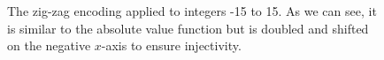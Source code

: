 \begin{figure}
\centering

	\caption[The zig-zag encoding applied to integers -15 to 15.]{\label{fig:zigzag}The zig-zag encoding applied to integers -15 to 15. As we can see, it is similar to the absolute value function but is doubled and shifted on the negative $x$-axis to ensure injectivity.}
\end{figure}
